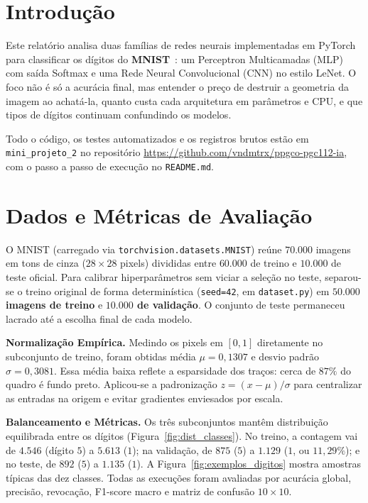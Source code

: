 \documentclass[
	12pt,
	a4paper,
	article,
	twocolumn
]{abntex2}
\begin{document}
\frenchspacing
\SingleSpacing

\maketitle

\section{Introdução}

Este relatório analisa duas famílias de redes neurais implementadas em PyTorch~\cite{paszke2019} para classificar os dígitos do \textbf{MNIST}~\cite{russell2020,smola2023}: um Perceptron Multicamadas (MLP) com saída Softmax e uma Rede Neural Convolucional (CNN) no estilo LeNet. O foco não é só a acurácia final, mas entender o preço de destruir a geometria da imagem ao achatá-la, quanto custa cada arquitetura em parâmetros e CPU, e que tipos de dígitos continuam confundindo os modelos.

Todo o código, os testes automatizados e os registros brutos estão em \texttt{mini\_projeto\_2} no repositório \url{https://github.com/vndmtrx/ppgco-pgc112-ia}, com o passo a passo de execução no \texttt{README.md}.

\section{Dados e Métricas de Avaliação}

O MNIST (carregado via \texttt{torchvision.datasets.MNIST}) reúne $70.000$ imagens em tons de cinza ($28 \times 28$ pixels) divididas entre $60.000$ de treino e $10.000$ de teste oficial. Para calibrar hiperparâmetros sem viciar a seleção no teste, separou-se o treino original de forma determinística (\texttt{seed=42}, em \texttt{dataset.py}) em \textbf{$50.000$ imagens de treino} e \textbf{$10.000$ de validação}. O conjunto de teste permaneceu lacrado até a escolha final de cada modelo.

\noindent\textbf{Normalização Empírica.} Medindo os pixels em $[0, 1]$ diretamente no subconjunto de treino, foram obtidas média $\mu = 0{,}1307$ e desvio padrão $\sigma = 0{,}3081$. Essa média baixa reflete a esparsidade dos traços: cerca de $87\%$ do quadro é fundo preto. Aplicou-se a padronização $z = (x - \mu)/\sigma$ para centralizar as entradas na origem e evitar gradientes enviesados por escala.

\medskip
\noindent\textbf{Balanceamento e Métricas.} Os três subconjuntos mantêm distribuição equilibrada entre os dígitos (Figura~\ref{fig:dist_classes}). No treino, a contagem vai de $4.546$ (dígito $5$) a $5.613$ ($1$); na validação, de $875$ ($5$) a $1.129$ ($1$, ou $11{,}29\%$); e no teste, de $892$ ($5$) a $1.135$ ($1$). A Figura~\ref{fig:exemplos_digitos} mostra amostras típicas das dez classes. Todas as execuções foram avaliadas por acurácia global, precisão, revocação, F1-score macro e matriz de confusão $10 \times 10$.
\end{document}
